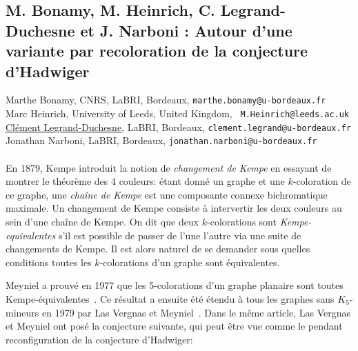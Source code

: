 \documentclass[a4paper,titlepage,12pt,normalheadings,makeidx]{article}
\begin{document}
\newpage

\subsection*{M. Bonamy, M. Heinrich, C. Legrand-Duchesne et J. Narboni : Autour d'une
  variante par recoloration de la conjecture d'Hadwiger}
%

%

%

Marthe Bonamy, CNRS, LaBRI, Bordeaux, {\tt marthe.bonamy@u-bordeaux.fr}\\
\indent
Marc Heinrich, University of Leeds, United Kingdom, {\tt
  M.Heinrich@leeds.ac.uk}\\
\indent
\underline{Clément Legrand-Duchesne}, LaBRI, Bordeaux, {\tt clement.legrand@u-bordeaux.fr}\\ %
\indent
Jonathan Narboni, LaBRI, Bordeaux, {\tt jonathan.narboni@u-bordeaux.fr}\\
\\

En 1879, Kempe introduit la notion de \emph{changement de Kempe} en essayant de
montrer le théorème des 4 couleurs: étant donné un graphe et une $k$-coloration
de ce graphe, une \emph{chaîne de Kempe} est une composante connexe
bichromatique maximale. Un changement de Kempe consiste à intervertir les deux
couleurs au sein d'une chaîne de Kempe. On dit que deux $k$-colorations sont
\emph{Kempe-equivalentes} s'il est possible de passer de l'une l'autre via une
suite de changements de Kempe. Il est alors naturel de se demander sous quelles
conditions toutes les $k$-colorations d'un graphe sont équivalentes.

Meyniel a prouvé en 1977 que les 5-colorations d'un graphe planaire sont toutes
Kempe-équivalentes~\cite{meyniel}. Ce résultat a ensuite été étendu à tous les
graphes sans $K_5$-mineurs en 1979 par Las Vergnas et
Meyniel~\cite{lasvergnas}. Dans le même article, Las Vergnas et Meyniel ont posé
la conjecture suivante, qui peut être vue comme le pendant reconfiguration de la
conjecture d'Hadwiger:
\end{document}
